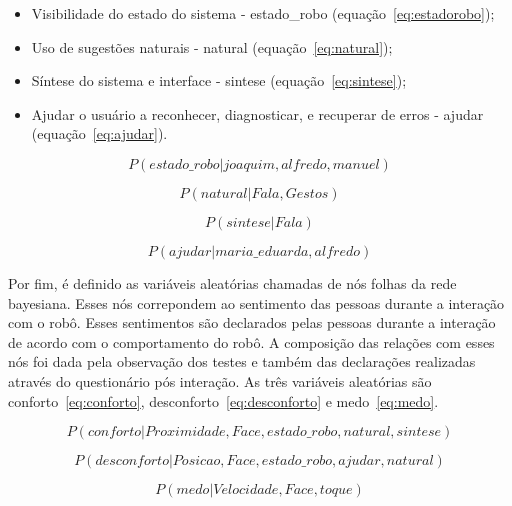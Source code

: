 \begin{itemize}
	\item Visibilidade do estado do sistema - estado\_robo (equação~\ref{eq:estadorobo});
	\item Uso de sugestões naturais - natural (equação~\ref{eq:natural});
	\item Síntese do sistema e interface - sintese (equação~\ref{eq:sintese});
	\item Ajudar o usuário a reconhecer, diagnosticar, e recuperar de erros - ajudar (equação~\ref{eq:ajudar}).
\end{itemize}

\begin{equation}
	\label{eq:estadorobo}
	P(estado\_robo | joaquim, alfredo, manuel)
\end{equation}

\begin{equation}
	\label{eq:natural}
	P(natural | Fala, Gestos)
\end{equation}

\begin{equation}
	\label{eq:sintese}
	P(sintese | Fala)
\end{equation}

\begin{equation}
	\label{eq:ajudar}
	P(ajudar | maria\_eduarda, alfredo)
\end{equation}

Por fim, é definido as variáveis aleatórias chamadas de nós folhas da rede bayesiana. Esses nós correpondem ao sentimento das pessoas durante a interação com o robô. Esses sentimentos são declarados pelas pessoas durante a interação de acordo com o comportamento do robô. A composição das relações com esses nós foi dada pela observação dos testes e também das declarações realizadas através do questionário pós interação. As três variáveis aleatórias são conforto~\ref{eq:conforto}, desconforto~\ref{eq:desconforto} e medo~\ref{eq:medo}.

\begin{equation}
	\label{eq:conforto}
	P(conforto | Proximidade, Face, estado\_robo, natural, sintese)
\end{equation}

\begin{equation}
	\label{eq:desconforto}
	P(desconforto | Posicao, Face, estado\_robo, ajudar, natural)
\end{equation}

\begin{equation}
	\label{eq:medo}
	P(medo | Velocidade, Face, toque)
\end{equation}

